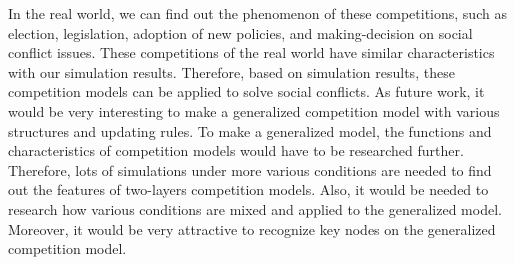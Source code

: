 In the real world, we can find out the phenomenon of these competitions, such as election, legislation, adoption of new policies, and making-decision on social conflict issues. These competitions of the real world have similar characteristics with our simulation results. Therefore, based on simulation results, these competition models can be applied to solve social conflicts. As future work, it would be very interesting to make a generalized competition model with various structures and updating rules. To make a generalized model, the functions and characteristics of competition models would have to be researched further. Therefore, lots of simulations under more various conditions are needed to find out the features of two-layers competition models. Also, it would be needed to research how various conditions are mixed and applied to the generalized model. Moreover, it would be very attractive to recognize key nodes on the generalized competition model.